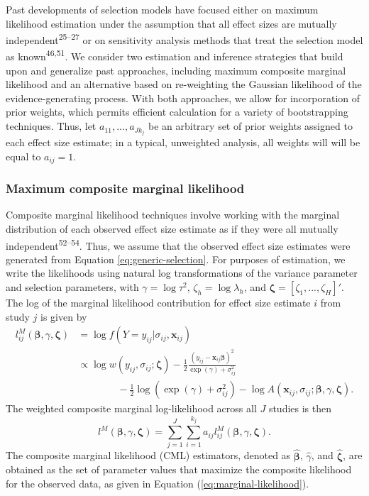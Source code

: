 \documentclass[
  american,
  man, donotrepeattitle,floatsintext]{apa7}
\begin{document}
Past developments of selection models have focused either on maximum likelihood estimation under the assumption that all effect sizes are mutually independent\textsuperscript{25--27} or on sensitivity analysis methods that treat the selection model as known\textsuperscript{46,51}. We consider two estimation and inference strategies that build upon and generalize past approaches, including maximum composite marginal likelihood and an alternative based on re-weighting the Gaussian likelihood of the evidence-generating process.
With both approaches, we allow for incorporation of prior weights, which permits efficient calculation for a variety of bootstrapping techniques.
Thus, let \(a_{11},...,a_{J k_j}\) be an arbitrary set of prior weights assigned to each effect size estimate; in a typical, unweighted analysis, all weights will will be equal to \(a_{ij} = 1\).

\subsubsection{Maximum composite marginal likelihood}\label{maximum-composite-marginal-likelihood}

Composite marginal likelihood techniques involve working with the marginal distribution of each observed effect size estimate as if they were all mutually independent\textsuperscript{52--54}.
Thus, we assume that the observed effect size estimates were generated from Equation \eqref{eq:generic-selection}.
For purposes of estimation, we write the likelihoods using natural log transformations of the variance parameter and selection parameters, with \(\gamma = \log \tau^2\), \(\zeta_h = \log \lambda_h\), and \(\boldsymbol\zeta = \left[\zeta_1,...,\zeta_H\right]'\).
The log of the marginal likelihood contribution for effect size estimate \(i\) from study \(j\) is given by
\begin{align}
l^M_{ij}\left(\boldsymbol\beta, \gamma, \boldsymbol\zeta \right) &= \log f\left(Y = y_{ij} | \sigma_{ij}, \mathbf{x}_{ij}\right) \nonumber \\
&\propto \log w\left(y_{ij}, \sigma_{ij}; \boldsymbol\zeta \right) - \frac{1}{2} \frac{\left(y_{ij} - \mathbf{x}_{ij} \boldsymbol\beta\right)^2}{\exp(\gamma) + \sigma_{ij}^2} \nonumber\\
& \qquad \qquad  - \frac{1}{2}\log\left(\exp(\gamma) + \sigma_{ij}^2\right) - \log A\left(\mathbf{x}_{ij}, \sigma_{ij}; \boldsymbol\beta, \gamma, \boldsymbol\zeta \right). \label{eq:log-like-ij}
\end{align}
The weighted composite marginal log-likelihood across all \(J\) studies is then
\begin{equation}
\label{eq:marginal-likelihood}
l^M\left(\boldsymbol\beta, \gamma, \boldsymbol\zeta\right) = \sum_{j=1}^J \sum_{i=1}^{k_j} a_{ij} l^M_{ij}\left(\boldsymbol\beta, \gamma, \boldsymbol\zeta\right).
\end{equation}
The composite marginal likelihood (CML) estimators, denoted as \(\boldsymbol{\hat\beta}\), \(\hat\gamma\), and \(\boldsymbol{\hat\zeta}\), are obtained as the set of parameter values that maximize the composite likelihood for the observed data, as given in Equation (\ref{eq:marginal-likelihood}).
\end{document}
